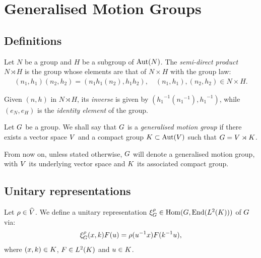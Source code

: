 \chapter{Generalised Motion Groups}
\label{chapter:generalised_motion_groups}

\section{Definitions}
\label{section:definitions}

\begin{definition}
\label{definition:semi-direct_products}
    Let $N$ be a group and $H$ be a subgroup of $\operatorname{Aut}(N)$.
    The \emph{semi-direct product} $N \rtimes H$ is the group whose elements are that of $N \times H$ with the group law:
    \begin{align}
        (n_1, h_1) (n_2, h_2) = (n_1 h_1(n_2), h_1 h_2), \quad (n_1, h_1), (n_2, h_2) \in N \times H.
    \end{align}

    Given $(n, h)$ in $N \rtimes H$, its \emph{inverse} is given by $({h_1}^{-1}({n_1}^{-1}), {h_1}^{-1})$,
    while $(e_N, e_H)$ is the \emph{identity element} of the group.
\end{definition}

\begin{definition}
\label{definition:generalised_motion_group}
    Let $G$ be a group.
    We shall say that $G$ is a \emph{generalised motion group}
    if there exists a vector space $V$ and a compact group $K \subset \operatorname{Aut}(V)$ such that $G = V \rtimes K$.
\end{definition}

From now on, unless stated otherwise,
$G$ will denote a generalised motion group,
with $V$ its underlying vector space and $K$ its associated compact group.

\section{Unitary representations}
\label{section:unitary_representations}

\begin{definition}
\label{definition:reducible_representation}
    Let $\rho \in {\widehat{V}}$.
    We define a unitary representation $\xi^{\rho}_G \in \operatorname{Hom}(G, \operatorname{End}({L^{2} (K)}))$ of $G$ via:
    \begin{align}
        \xi^{\rho}_G (x, k) F(u) = \rho(u^{-1} x) F(k^{-1} u),
    \end{align}
    where $(x, k) \in K$, $F \in {L^{2} (K)}$ and $u \in K$.
\end{definition}


